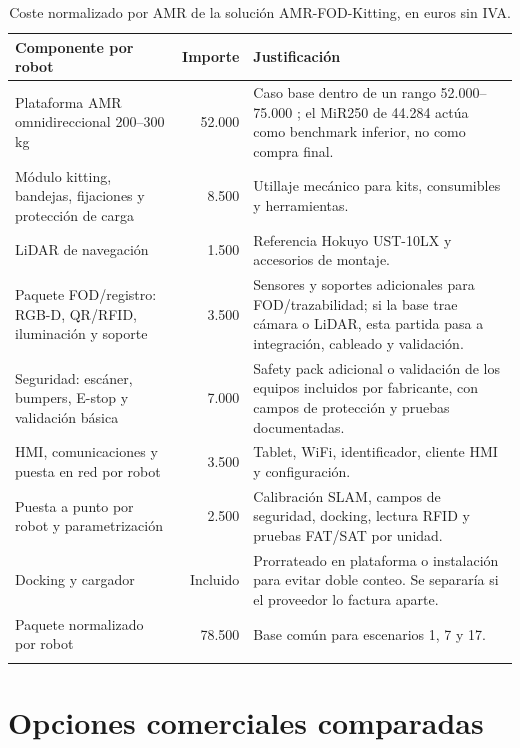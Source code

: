 \begin{longtable}{P{0.46\textwidth}rP{0.32\textwidth}}
\toprule
Componente por robot & Importe & Justificación\\
\midrule
\endhead
Plataforma AMR omnidireccional 200--300 kg & 52.000 & Caso base dentro de un rango 52.000--75.000 \texteuro{}; el MiR250 de 44.284 \texteuro{} actúa como benchmark inferior, no como compra final.\\
Módulo kitting, bandejas, fijaciones y protección de carga & 8.500 & Utillaje mecánico para kits, consumibles y herramientas.\\
LiDAR de navegación & 1.500 & Referencia Hokuyo UST-10LX y accesorios de montaje.\\
Paquete FOD/registro: RGB-D, QR/RFID, iluminación y soporte & 3.500 & Sensores y soportes adicionales para FOD/trazabilidad; si la base trae cámara o LiDAR, esta partida pasa a integración, cableado y validación.\\
Seguridad: escáner, bumpers, E-stop y validación básica & 7.000 & Safety pack adicional o validación de los equipos incluidos por fabricante, con campos de protección y pruebas documentadas.\\
HMI, comunicaciones y puesta en red por robot & 3.500 & Tablet, WiFi, identificador, cliente HMI y configuración.\\
Puesta a punto por robot y parametrización & 2.500 & Calibración SLAM, campos de seguridad, docking, lectura RFID y pruebas FAT/SAT por unidad.\\
\midrule
Docking y cargador & Incluido & Prorrateado en plataforma o instalación para evitar doble conteo. Se separaría si el proveedor lo factura aparte.\\
\midrule
Paquete normalizado por robot & 78.500 & Base común para escenarios 1, 7 y 17.\\
\bottomrule
\caption{Coste normalizado por AMR de la solución AMR-FOD-Kitting, en euros sin IVA.}
\label{tab:coste-robot-normalizado}
\end{longtable}

\section{Opciones comerciales comparadas}

